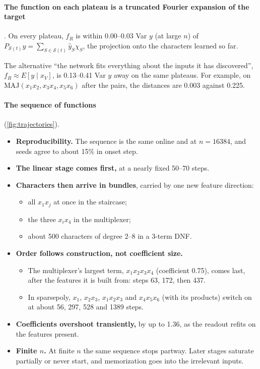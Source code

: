 \paragraph{The function on each plateau is a truncated Fourier expansion of the target} . On every plateau, $f_R$ is within 0.00–0.03 Var $y$ (at large $n$) of $P_{\mathcal S(t)}y=\sum_{S\in\mathcal S(t)}\hat y_S\chi_S$, the projection onto the characters learned so far.

The alternative ``the network fits everything about the inputs it has discovered'', $f_R\approx E[y\mid x_V]$, is 0.13–0.41 Var $y$ away on the same plateaus. For example, on MAJ$(x_1x_2,x_3x_4,x_5x_6)$ after the pairs, the distances are 0.003 against 0.225.

\paragraph{The sequence of functions}  (\cref{fig:trajectories}).
\begin{itemize}
\item \textbf{Reproducibility.} The sequence is the same online and at $n=16384$, and seeds agree to about 15\% in onset step.
\item \textbf{The linear stage comes first,} at a nearly fixed 50–70 steps.
\item \textbf{Characters then arrive in bundles}, carried by one new feature direction:
  \begin{itemize}
  \item all $x_1x_j$ at once in the staircase;
  \item the three $x_ix_4$ in the multiplexer;
  \item about 500 characters of degree 2–8 in a 3-term DNF.
  \end{itemize}
\item \textbf{Order follows construction, not coefficient size.}
  \begin{itemize}
  \item The multiplexer's largest term, $x_1x_2x_3x_4$ (coefficient 0.75), comes last, after the features it is built from: steps 63, 172, then 437.
  \item In sparsepoly, $x_1$, $x_2x_3$, $x_1x_2x_3$ and $x_4x_5x_6$ (with its products) switch on at about 56, 297, 528 and 1389 steps.
  \end{itemize}
\item \textbf{Coefficients overshoot transiently,} by up to 1.36, as the readout refits on the features present.
\item \textbf{Finite $n$.} At finite $n$ the same sequence stops partway. Later stages saturate partially or never start, and memorization goes into the irrelevant inputs.
\end{itemize}


